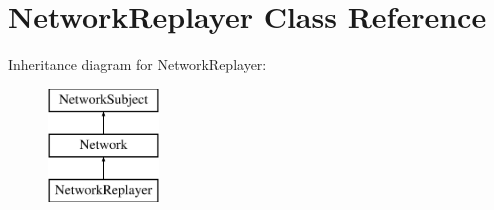 \hypertarget{classNetworkReplayer}{
\section{NetworkReplayer Class Reference}
\label{classNetworkReplayer}
}
Inheritance diagram for NetworkReplayer:\begin{figure}[H]
\begin{center}
\leavevmode
\includegraphics[height=3cm]{classNetworkReplayer}
\end{center}
\end{figure}
